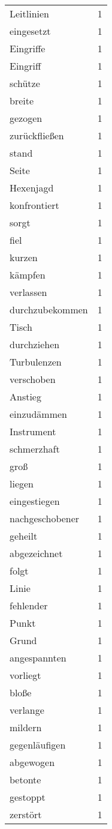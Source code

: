 \begin{tabular}{lr}
Leitlinien & 1 \\
eingesetzt & 1 \\
Eingriffe & 1 \\
Eingriff & 1 \\
schütze & 1 \\
breite & 1 \\
gezogen & 1 \\
zurückfließen & 1 \\
stand & 1 \\
Seite & 1 \\
Hexenjagd & 1 \\
konfrontiert & 1 \\
sorgt & 1 \\
fiel & 1 \\
kurzen & 1 \\
kämpfen & 1 \\
verlassen & 1 \\
durchzubekommen & 1 \\
Tisch & 1 \\
durchziehen & 1 \\
Turbulenzen & 1 \\
verschoben & 1 \\
Anstieg & 1 \\
einzudämmen & 1 \\
Instrument & 1 \\
schmerzhaft & 1 \\
groß & 1 \\
liegen & 1 \\
eingestiegen & 1 \\
nachgeschobener & 1 \\
geheilt & 1 \\
abgezeichnet & 1 \\
folgt & 1 \\
Linie & 1 \\
fehlender & 1 \\
Punkt & 1 \\
Grund & 1 \\
angespannten & 1 \\
vorliegt & 1 \\
bloße & 1 \\
verlange & 1 \\
mildern & 1 \\
gegenläufigen & 1 \\
abgewogen & 1 \\
betonte & 1 \\
gestoppt & 1 \\
zerstört & 1 \\

\end{tabular}
